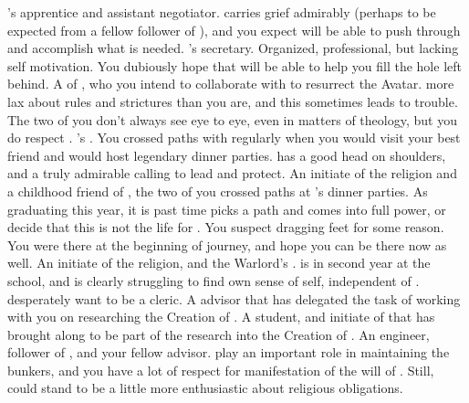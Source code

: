 \documentclass[char]{GL2020}
\begin{document}
\begin{contacts}
    \contact{\cJuniorStatesman{}} \cHeadDiplomat{}'s apprentice and assistant negotiator. \cJuniorStatesman{} carries \cJuniorStatesman{\their} grief admirably (perhaps to be expected from a fellow follower of \cEbb{}), and you expect \cJuniorStatesman{\they} will be able to push through and accomplish what is needed. 
    \contact{\cChupLeader{}} \cHeadDiplomat{}'s secretary. Organized, professional, but lacking self motivation. You dubiously hope that \cChupLeader{\they} will be able to help you fill the hole \cHeadDiplomat{} left behind.
    \contact{\cFlowPriest{}} A \cFlowPriest{\cleric} of \cFlow{}, who you intend to collaborate with to resurrect the \cEbb{} Avatar. \cFlowPriest{\They} \cFlowPriest{\are} more lax about rules and strictures than you are, and this sometimes leads to trouble. The two of you don't always see eye to eye, even in matters of theology, but you do respect \cFlowPriest{\them}.
    \contact{\cPresident{}} \cHeadDiplomat{}’s \cPresident{\nibling}. You crossed paths with \cPresident{\them} regularly when you would visit your best friend and \cHeadDiplomat{} would host \cHeadDiplomat{\their} legendary dinner parties. \cPresident{} has a good head on \cPresident{\their} shoulders, and a truly admirable calling to lead and protect.
    \contact{\cInitiate{}} An initiate of the \pShippie{} religion and a childhood friend of \cPresident{}, the two of you crossed paths at \cHeadDiplomat{}’s dinner parties. As \cInitiate{\they} \cInitiate{\are} graduating this year, it is past time \cInitiate{} picks a path and comes into \cInitiate{\their} full power, or decide that this is not the life for \cInitiate{\them}. You suspect \cInitiate{\they} \cInitiate{\are} dragging \cInitiate{\their} feet for some reason. You were there at the beginning of \cInitiate{\their} journey, and hope you can be there now as well.                
     \contact{\cWarlordDaughter{}} An initiate of the \pShippie{} religion, and the Warlord's \cWarlordDaughter{\offspring}. \cWarlordDaughter{} is in \cWarlordDaughter{\their} second year at the school, and is clearly struggling to find \cWarlordDaughter{\their} own sense of self, independent of \cWarlordDaughter{\their} \cLoud{\parent}. \cWarlordDaughter{\They} desperately want\cWarlordDaughter{\verbs} to be a cleric. 
    \contact{\cHeadScientist{}} A \pTech{} advisor that \cBeetle{} has delegated the task of working with you on researching the Creation of \pEarth{}.
    \contact{\cScholarship{}} A \pTech{} student, and initiate of \cTechGod{} that \cHeadScientist{} has brought along to be part of the research into the Creation of \pEarth{}.
    \contact{\cBunker{}} An engineer, follower of \cEbb{}, and your fellow advisor. \cBunker{\They} play\cBunker{\verbs} an important role in maintaining the bunkers, and you have a lot of respect for \cBunker{\their} manifestation of the will of \cEbb{}. Still, \cBunker{\they} could stand to be a little more enthusiastic about \cBunker{\their} religious obligations.
\end{contacts}
\end{document}
